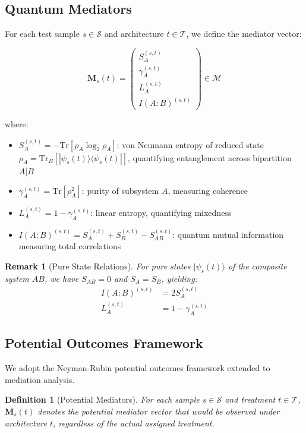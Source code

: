 \documentclass[
    reprint,
    amsmath, amssymb,
    aps,
    floatfix,
    nofootinbib
]{revtex4-1}
\newtheorem{definition}{Definition}
\newtheorem{remark}{Remark}
\begin{document}
\subsection{Quantum Mediators}

For each test sample $s \in \mathcal{S}$ and architecture $t \in \mathcal{T}$, we define the mediator vector:

\begin{equation}
    \bm{M}_s(t) = \begin{pmatrix}
    S_A^{(s,t)} \\
    \gamma_A^{(s,t)} \\
    L_A^{(s,t)} \\
    I(A:B)^{(s,t)}
    \end{pmatrix} \in \mathcal{M}
\end{equation}

where:
\begin{itemize}
    \item $S_A^{(s,t)} = -\text{Tr}[\rho_A \log_2 \rho_A]$: von Neumann entropy of reduced state $\rho_A = \text{Tr}_B[|\psi_s(t)\rangle\langle\psi_s(t)|]$, quantifying entanglement across bipartition $A|B$
    \item $\gamma_A^{(s,t)} = \text{Tr}[\rho_A^2]$: purity of subsystem $A$, measuring coherence
    \item $L_A^{(s,t)} = 1 - \gamma_A^{(s,t)}$: linear entropy, quantifying mixedness
    \item $I(A:B)^{(s,t)} = S_A^{(s,t)} + S_B^{(s,t)} - S_{AB}^{(s,t)}$: quantum mutual information measuring total correlations
\end{itemize}

\begin{remark}[Pure State Relations]
For pure states $|\psi_s(t)\rangle$ of the composite system $AB$, we have $S_{AB} = 0$ and $S_A = S_B$, yielding:
\begin{align}
    I(A:B)^{(s,t)} &= 2S_A^{(s,t)} \label{eq:mutual_info_pure}\\
    L_A^{(s,t)} &= 1 - \gamma_A^{(s,t)} \label{eq:linear_entropy_purity}
\end{align}
\end{remark}

\subsection{Potential Outcomes Framework}

We adopt the Neyman-Rubin potential outcomes framework extended to mediation analysis.
\begin{definition}[Potential Mediators]
For each sample $s \in \mathcal{S}$ and treatment $t \in \mathcal{T}$, $\bm{M}_s(t)$ denotes the potential mediator vector that would be observed under architecture $t$, regardless of the actual assigned treatment.
\end{definition}
\end{document}
